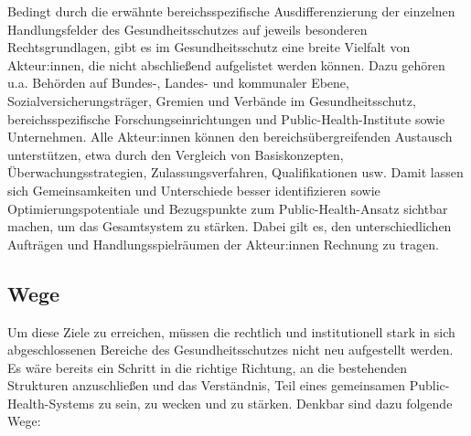 \documentclass{article}
\begin{document}
Bedingt durch die erwähnte bereichsspezifische Ausdifferenzierung der einzelnen Handlungsfelder des Gesundheitsschutzes auf jeweils besonderen Rechtsgrundlagen, gibt es im Gesundheitsschutz eine breite Vielfalt von Akteur:innen, die nicht abschließend aufgelistet werden können. Dazu gehören u.a. Behörden auf Bundes-, Landes- und kommunaler Ebene, Sozialversicherungsträger, Gremien und Verbände im Gesundheitsschutz, bereichsspezifische Forschungseinrichtungen und Public-Health-Institute sowie Unternehmen. Alle Akteur:innen können den bereichsübergreifenden Austausch unterstützen, etwa durch den Vergleich von Basiskonzepten, Überwachungsstrategien, Zulassungsverfahren, Qualifikationen usw. Damit lassen sich Gemeinsamkeiten und Unterschiede besser identifizieren sowie Optimierungspotentiale und Bezugspunkte zum Public-Health-Ansatz sichtbar machen, um das Gesamtsystem zu stärken. Dabei gilt es, den unterschiedlichen Aufträgen und Handlungsspielräumen der Akteur:innen Rechnung zu tragen.


\subsection{Wege}\label{H2679358}



Um diese Ziele zu erreichen, müssen die rechtlich und institutionell stark in sich abgeschlossenen Bereiche des Gesundheitsschutzes nicht neu aufgestellt werden. Es wäre bereits ein Schritt in die richtige Richtung, an die bestehenden Strukturen anzuschließen und das Verständnis, Teil eines gemeinsamen Public-Health-Systems zu sein, zu wecken und zu stärken. Denkbar sind dazu folgende Wege:
\end{document}

